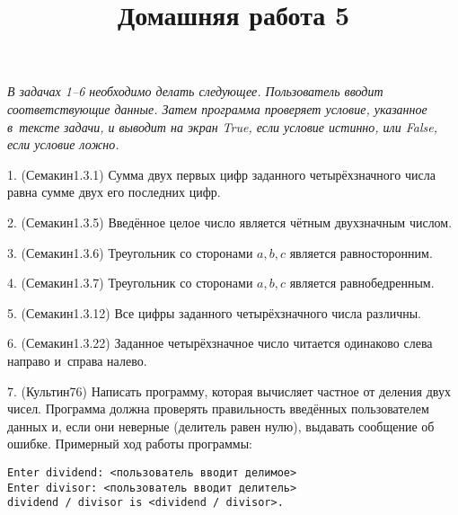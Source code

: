 \documentclass[12pt,russian,draft]{article}
\title{Домашняя работа 5}
\date{}
\begin{document}
\maketitle{}

\emph{В задачах 1--6 необходимо делать следующее. Пользователь вводит
    соответствующие данные. Затем программа проверяет условие, указанное
    в~тексте задачи, и выводит на экран True, если условие истинно, или
    False, если условие ложно.}

1. (Семакин1.3.1) Сумма двух первых цифр заданного четырёхзначного числа равна
сумме двух его последних цифр.

2. (Семакин1.3.5) Введённое целое число является чётным двухзначным числом.

3. (Семакин1.3.6) Треугольник со сторонами $a, b, c$ является равносторонним.

4. (Семакин1.3.7) Треугольник со сторонами $a, b, c$ является равнобедренным.

5. (Семакин1.3.12) Все цифры заданного четырёхзначного числа различны.

6. (Семакин1.3.22) Заданное четырёхзначное число читается одинаково слева
направо и~справа налево.

7. (Культин76) Написать программу, которая вычисляет частное от деления двух чисел. Программа 
должна проверять правильность введённых пользователем данных и, если они неверные (делитель равен нулю), 
выдавать сообщение об ошибке. Примерный ход работы программы:

\begin{Verbatim}
Enter dividend: <пользователь вводит делимое>
Enter divisor: <пользователь вводит делитель>
dividend / divisor is <dividend / divisor>.
\end{Verbatim}
\end{document}
